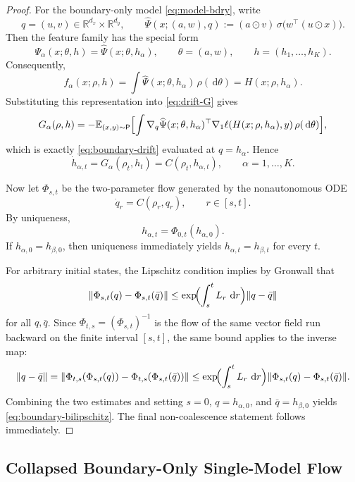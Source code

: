\documentclass[11pt]{article}
\theoremstyle{definition}
\newcommand{\R}{\mathbb{R}}
\newcommand{\E}{\mathbb{E}}
\newcommand{\dd}{\,\mathrm{d}}
\begin{document}
\begin{proof}
For the boundary-only model \eqref{eq:model-bdry}, write
\[
  q=(u,v)\in\R^{d_x}\times\R^{d_y},
  \qquad
  \widehat\Psi(x;(a,w),q)
  :=
  (a\odot v)\,\sigma\!\bigl(w^\top(u\odot x)\bigr).
\]
Then the feature family has the special form
\[
  \Psi_\alpha(x;\theta,h)=\widehat\Psi(x;\theta,h_\alpha),
  \qquad
  \theta=(a,w),
  \qquad
  h=(h_1,\dots,h_K).
\]
Consequently,
\[
  f_\alpha(x;\rho,h)
  =
  \int \widehat\Psi(x;\theta,h_\alpha)\,\rho(\dd\theta)
  =
  H(x;\rho,h_\alpha).
\]
Substituting this representation into \eqref{eq:drift-G} gives
\[
  G_\alpha(\rho,h)
  =
  -\E_{(x,y)\sim\mathsf P}
  \Bigl[
    \int
    \nabla_q\widehat\Psi(x;\theta,h_\alpha)^\top
    \nabla_1\ell(H(x;\rho,h_\alpha),y)\,\rho(\dd\theta)
  \Bigr],
\]
which is exactly \eqref{eq:boundary-drift} evaluated at
$q=h_\alpha$. Hence
\[
  \dot h_{\alpha,t}=G_\alpha(\rho_t,h_t)=C(\rho_t,h_{\alpha,t}),
  \qquad
  \alpha=1,\dots,K.
\]

Now let $\Phi_{s,t}$ be the two-parameter flow generated by the
nonautonomous ODE
\[
  \dot q_r=C(\rho_r,q_r),
  \qquad
  r\in[s,t].
\]
By uniqueness,
\[
  h_{\alpha,t}=\Phi_{0,t}(h_{\alpha,0}).
\]
If $h_{\alpha,0}=h_{\beta,0}$, then uniqueness immediately yields
$h_{\alpha,t}=h_{\beta,t}$ for every $t$.

For arbitrary initial states, the Lipschitz condition implies by Gronwall that
\[
  \|\Phi_{s,t}(q)-\Phi_{s,t}(\bar q)\|
  \le
  \exp\!\Bigl(\int_s^t L_r\,\dd r\Bigr)\|q-\bar q\|
\]
for all $q,\bar q$. Since $\Phi_{t,s}=(\Phi_{s,t})^{-1}$ is the flow of the
same vector field run backward on the finite interval $[s,t]$, the same bound
applies to the inverse map:
\[
  \|q-\bar q\|
  =
  \|\Phi_{t,s}(\Phi_{s,t}(q))-\Phi_{t,s}(\Phi_{s,t}(\bar q))\|
  \le
  \exp\!\Bigl(\int_s^t L_r\,\dd r\Bigr)
  \|\Phi_{s,t}(q)-\Phi_{s,t}(\bar q)\|.
 \]
Combining the two estimates and setting $s=0$,
$q=h_{\alpha,0}$, and $\bar q=h_{\beta,0}$ yields
\eqref{eq:boundary-bilipschitz}. The final non-coalescence statement follows
immediately.
\end{proof}

\subsection{Collapsed Boundary-Only Single-Model Flow}
\end{document}
